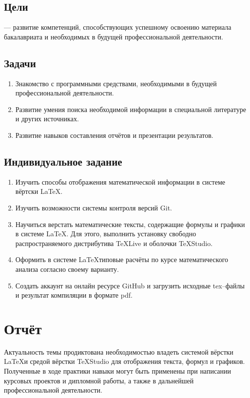 \documentclass[12pt]{article}
\begin{document}
\subsection{Цели}
--- развитие компетенций, способствующих успешному освоению материала бакалавриата и необходимых в будущей профессиональной деятельности.

\subsection{Задачи}
\begin{enumerate}
\item Знакомство с программными средствами, необходимыми в будущей профессиональной деятельности.
\item Развитие умения поиска необходимой информации в специальной литературе и других источниках.
\item Развитие навыков составления отчётов и презентации результатов.
\end{enumerate}

\subsection{Индивидуальное задание}	
\begin{enumerate}
\item Изучить способы отображения математической информации в системе вёртски \LaTeX.
\item Изучить возможности  системы контроля версий \textsf{Git}.
\item Научиться верстать математические тексты, содержащие формулы и графики в системе \LaTeX.
Для этого, выполнить установку свободно распространяемого дистрибутива \textsf{TeXLive} и оболочки \textsf{TeXStudio}.
\item Оформить в системе \LaTeX типовые расчёты по курсе математического анализа согласно своему варианту.
\item Создать аккаунт на онлайн ресурсе \textsf{GitHub} и загрузить исходные \textsf{tex}--файлы 
и результат компиляции в формате \textsf{pdf}.
\end{enumerate}
 
\newpage
\section{Отчёт}
Актуальность темы продиктована необходимостью владеть системой вёрстки \LaTeX и средой вёрстки \textsf{TeXStudio} для
отображения текста, формул и графиков. Полученные в ходе практики навыки могут быть применены при написании
курсовых проектов и дипломной работы, а также в дальнейшей профессиональной деятельности.
\end{document}
